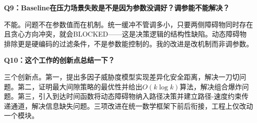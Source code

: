 \documentclass[a4paper,11pt]{ctexart}
\begin{document}
\textbf{Q9：Baseline在压力场景失败是不是因为参数没调好？调参能不能解决？}

不能。问题不在参数值而在机制。统一缓冲不管调多小，只要两侧障碍物同时存在且贪心方向冲突，就会BLOCKED——这是决策逻辑的结构性缺陷。动态障碍物排除更是硬编码的过滤条件，不是参数能控制的。我的改进是改机制而非调参数。

\textbf{Q10：这个工作的创新点总结一下？}

三个创新点。第一，提出多因子威胁度模型实现差异化安全距离，解决一刀切问题。第二，证明最大间隙策略的最优性并给出$O(k\log k)$算法，解决组合爆炸问题。第三，引入到达时间函数将动态障碍物纳入路径决策并建立路径-速度约束传递通道，解决信息缺失问题。三项改进在统一数学框架下前后衔接，工程上仅改动一个模块。
\end{document}

